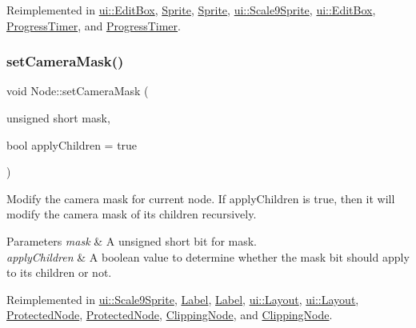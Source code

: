 Reimplemented in \hyperlink{classui_1_1EditBox_a6e433ab6bbaa15560a049dfe05087294}{ui\+::\+Edit\+Box}, \hyperlink{classSprite_a218c16399fb6c93f2f6dd7b29b54e238}{Sprite}, \hyperlink{classSprite_ace1c8b1ba17bcf1086730e192b914a78}{Sprite}, \hyperlink{classui_1_1Scale9Sprite_a7153fb170a630efc0748e0db6678963f}{ui\+::\+Scale9\+Sprite}, \hyperlink{classui_1_1EditBox_ad17a8fc58f78d77e47106170e6db9f39}{ui\+::\+Edit\+Box}, \hyperlink{classProgressTimer_a9f177a39d3158dd2f48f6558db5dcd02}{Progress\+Timer}, and \hyperlink{classProgressTimer_a2d83a3a9d2aa6a7d949a3800c82dfc68}{Progress\+Timer}.

\mbox{\label{classNode_a0403546687b2cb6fc211fb461e33ba4d}} 
\subsubsection{\texorpdfstring{set\+Camera\+Mask()}{setCameraMask()}\hspace{0.1cm}{\footnotesize\ttfamily [1/2]}}
{\footnotesize\ttfamily void Node\+::set\+Camera\+Mask (\begin{DoxyParamCaption}\item[{unsigned short}]{mask,  }\item[{bool}]{apply\+Children = {\ttfamily true} }\end{DoxyParamCaption})\hspace{0.3cm}{\ttfamily [virtual]}}

Modify the camera mask for current node. If apply\+Children is true, then it will modify the camera mask of its children recursively. 
\begin{DoxyParams}{Parameters}
{\em mask} & A unsigned short bit for mask. \\
\hline
{\em apply\+Children} & A boolean value to determine whether the mask bit should apply to its children or not. \\
\hline
\end{DoxyParams}


Reimplemented in \hyperlink{classui_1_1Scale9Sprite_ab871c3756134c9f991876cd78ae1ef03}{ui\+::\+Scale9\+Sprite}, \hyperlink{classLabel_a8657a6d35049d6e66a79759f93890a6d}{Label}, \hyperlink{classLabel_a2766bd9d3aa727ee7c50d730af35b9dc}{Label}, \hyperlink{classui_1_1Layout_a7468a69a70aa481c7a429db365f0362c}{ui\+::\+Layout}, \hyperlink{classui_1_1Layout_a38e44717b8af16b5b5c1f299081ae854}{ui\+::\+Layout}, \hyperlink{classProtectedNode_ad259bd1bedc5f273b3850c74dc58c2f2}{Protected\+Node}, \hyperlink{classProtectedNode_a45ddaa88c746ea6707b8a09bb50b457d}{Protected\+Node}, \hyperlink{classClippingNode_a1a2f97b7a006e6b830632eab1e812f90}{Clipping\+Node}, and \hyperlink{classClippingNode_afced4609ebbd5d239d1e3d07b6d4b217}{Clipping\+Node}.

